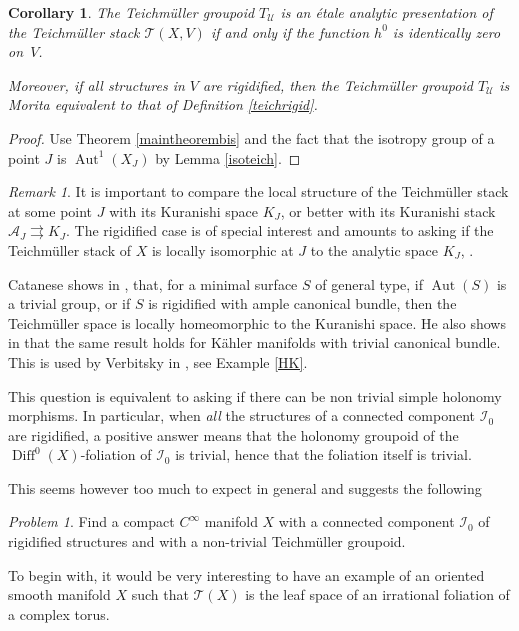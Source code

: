 \documentclass[10pt]{amsart}
\let\mathcal\mathscr
\DeclareMathOperator{\Aut}{Aut}
\DeclareMathOperator{\Diff}{Diff}
\theoremstyle{plain}
\newtheorem{corollary}[theorem]{Corollary}
\theoremstyle{definition}
\theoremstyle{remark}
\newtheorem{remark}[theorem]{Remark}
\newtheorem{problem}[theorem]{Problem}
\numberwithin{equation}{section}
\newcommand{\cI}{\mathcal{I}}
\begin{document}
\begin{corollary}
\label{etale?}
The Teichmüller groupoid $T_\mathcal U$ is an étale analytic presentation of the Teichmüller stack $\mathcal T(X,V)$ if and only if the function $h^0$ is identically zero on~$V$.

Moreover, if all structures in $V$ are rigidified, then the Teichmüller groupoid $T_\mathcal U$ is Morita equivalent to that of Definition \ref{teichrigid}.
\end{corollary}

\begin{proof}
Use Theorem \ref{maintheorembis} and the fact that the isotropy group of a point $J$ is $\Aut^1(X_J)$ by Lemma \ref{isoteich}.
\end{proof}

\begin{remark}
\label{Catanese}
It is important to compare the local structure of the Teichmüller stack at some point $J$ with its Kuranishi space $K_J$, or better with its Kuranishi stack $\mathcal A_J\rightrightarrows K_J$. The rigidified case is of special interest and amounts to asking if the Teichmüller stack of $X$ is locally isomorphic at $J$ to the analytic space $K_J$, \cf \cite{Catsurvey}.

Catanese shows in \cite[Th.\,45]{Catsurvey}, that, for a minimal surface $S$ of general type, if $\Aut(S)$ is a trivial group, or
if $S$ is rigidified with ample canonical bundle, then the Teichmüller space is locally homeomorphic to the Kuranishi space. He also shows in \cite[Prop.\,15]{Catsurvey} that the same result holds for Kähler manifolds with trivial canonical bundle. This is used by Verbitsky in \cite{Verbitsky}, see Example \ref{HK}.

This question is equivalent to asking if there can be non trivial simple holonomy morphisms. In particular, when \emph{all} the structures of a connected component $\cI_0$ are rigidified, a positive answer means that the holonomy groupoid of the $\Diff^0(X)$-foliation of $\cI_0$ is trivial, hence that the foliation itself is trivial.

This seems however too much to expect in general and suggests the following
\begin{problem}
\label{holonomyproblem}
Find a compact $C^\infty$ manifold $X$ with a connected component $\cI_0$ of rigidified structures and with a non-trivial Teichmüller groupoid.
\end{problem}
To begin with, it would be very interesting to have an example of an oriented smooth manifold $X$ such that $\mathcal T(X)$ is the leaf space of an irrational foliation of a complex torus.
\end{remark}
\end{document}
